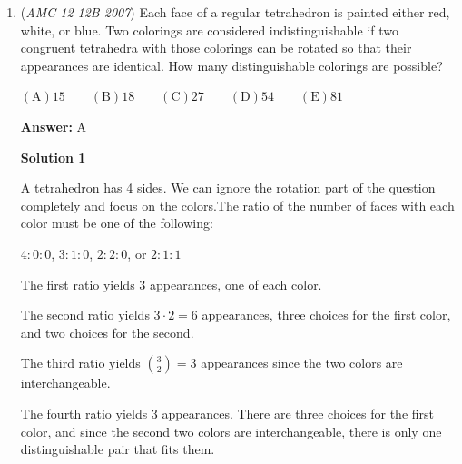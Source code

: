 \begin{enumerate}
 Its sum can be given by $\frac{ar}{1-r^2} = 3$

 Doing a little algebra

 $ar = 3(1-r)(1+r)$
$ar = 3\left(\frac{a}{7}\right)(1+r)$
$\frac{7}{3}r = 1 + r$
$r = \frac{3}{4}$
$a = 7(1-r) = \frac{7}{4}$
$a + r =\boxed{ \frac{5}{2}} \Rightarrow \mathrm{(E)}$




\textbf{Solution 2}

The given series can be decomposed as follows: $(a + ar + ar^2 + \ldots) = (a + ar^2 + ar^4 + \ldots) + (ar + ar^3 + ar^5 + \ldots)$

 Clearly $(a + ar^2 + ar^4 + \ldots) = (ar + ar^3 + ar^5 + \ldots)/r = 3/r$. We obtain that $7 = 3/r + 3$, hence $r = \frac{3}{4}$.

 Then from $7 = (a + ar + ar^2 + \ldots) = \frac{a}{1-r}$ we get $a=\frac{7}{4}$, and thus $a + r = \boxed{\frac{5}{2}}$.

 


	\item (\textit{AMC 12 12B 2007}) Each face of a regular tetrahedron is painted either red, white, or blue. Two colorings are considered indistinguishable if two congruent tetrahedra with those colorings can be rotated so that their appearances are identical. How many distinguishable colorings are possible?


 $\mathrm {(A)} 15\qquad \mathrm {(B)} 18\qquad \mathrm {(C)} 27\qquad \mathrm {(D)} 54\qquad \mathrm {(E)} 81$

 \textbf{Answer: }A



\textbf{Solution 1}

A tetrahedron has 4 sides. We can ignore the rotation part of the question completely and focus on the colors.The ratio of the number of faces with each color must be one of the following:

 $4:0:0$, $3:1:0$, $2:2:0$, or $2:1:1$

 


 The first ratio yields $3$ appearances, one of each color.

 The second ratio yields $3\cdot 2 = 6$ appearances, three choices for the first color, and two choices for the second.

 The third ratio yields $\binom{3}{2} = 3$ appearances since the two colors are interchangeable.

 The fourth ratio yields $3$ appearances. There are three choices for the first color, and since the second two colors are interchangeable, there is only one distinguishable pair that fits them.


\end{enumerate}

